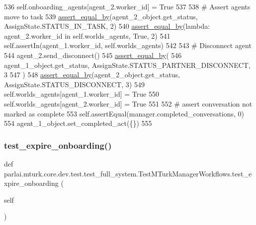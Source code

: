 \begin{DoxyCode}
536         self.onboarding\_agents[agent\_2.worker\_id] = \textcolor{keyword}{True}
537 
538         \textcolor{comment}{# Assert agents move to task}
539         \hyperlink{namespaceparlai_1_1mturk_1_1core_1_1test_1_1test__full__system_a0b463246d35658a2e422010f13dcf819}{assert\_equal\_by}(agent\_2\_object.get\_status, AssignState.STATUS\_IN\_TASK, 2)
540         \hyperlink{namespaceparlai_1_1mturk_1_1core_1_1test_1_1test__full__system_a0b463246d35658a2e422010f13dcf819}{assert\_equal\_by}(\textcolor{keyword}{lambda}: agent\_2.worker\_id \textcolor{keywordflow}{in} self.worlds\_agents, \textcolor{keyword}{True}, 2)
541         self.assertIn(agent\_1.worker\_id, self.worlds\_agents)
542 
543         \textcolor{comment}{# Disconnect agent}
544         agent\_2.send\_disconnect()
545         \hyperlink{namespaceparlai_1_1mturk_1_1core_1_1test_1_1test__full__system_a0b463246d35658a2e422010f13dcf819}{assert\_equal\_by}(
546             agent\_1\_object.get\_status, AssignState.STATUS\_PARTNER\_DISCONNECT, 3
547         )
548         \hyperlink{namespaceparlai_1_1mturk_1_1core_1_1test_1_1test__full__system_a0b463246d35658a2e422010f13dcf819}{assert\_equal\_by}(agent\_2\_object.get\_status, AssignState.STATUS\_DISCONNECT, 3)
549         self.worlds\_agents[agent\_1.worker\_id] = \textcolor{keyword}{True}
550         self.worlds\_agents[agent\_2.worker\_id] = \textcolor{keyword}{True}
551 
552         \textcolor{comment}{# assert conversation not marked as complete}
553         self.assertEqual(manager.completed\_conversations, 0)
554         agent\_1\_object.set\_completed\_act(\{\})
555 
\end{DoxyCode}
\mbox{\label{classparlai_1_1mturk_1_1core_1_1dev_1_1test_1_1test__full__system_1_1TestMTurkManagerWorkflows_ad1c8b65395e4d230f2289a0c95da5da0}} 
\subsubsection{\texorpdfstring{test\+\_\+expire\+\_\+onboarding()}{test\_expire\_onboarding()}}
{\footnotesize\ttfamily def parlai.\+mturk.\+core.\+dev.\+test.\+test\+\_\+full\+\_\+system.\+Test\+M\+Turk\+Manager\+Workflows.\+test\+\_\+expire\+\_\+onboarding (\begin{DoxyParamCaption}\item[{}]{self }\end{DoxyParamCaption})}



